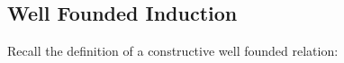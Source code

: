 \begin{code}[hide]
\AgdaSpace{}%
\AgdaSpace{}%
\AgdaSpace{}%
\AgdaSpace{}%
\AgdaSpace{}%
\AgdaSpace{}%
\AgdaSpace{}%
\AgdaSpace{}%
\AgdaSpace{}%
\<%
\\
%
\>[4]\AgdaSpace{}%
\AgdaSymbol{(}\AgdaSpace{}%
\AgdaSymbol{)}\AgdaSpace{}%
\AgdaSymbol{=}\AgdaSpace{}%
\<%
\\
%
\\[\AgdaEmptyExtraSkip]%
%
\>[4]\AgdaSpace{}%
\AgdaSpace{}%
\<%
\end{code}

\subsection{Well Founded Induction}

Recall the definition of a constructive well founded relation:



